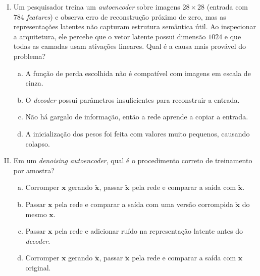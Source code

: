 \documentclass{dlproblemset}
\begin{document}
\begin{enumerate}[I)]

    \item Um pesquisador treina um \textit{autoencoder} sobre imagens $28 \times 28$ (entrada com $784$ \textit{features}) e observa erro de reconstrução próximo de zero, mas as representações latentes não capturam estrutura semântica útil. Ao inspecionar a arquitetura, ele percebe que o vetor latente possui dimensão $1024$ e que todas as camadas usam ativações lineares. Qual é a causa mais provável do problema?
    \begin{enumerate}[(a)]
        \item A função de perda escolhida não é compatível com imagens em escala de cinza.
        \item O \textit{decoder} possui parâmetros insuficientes para reconstruir a entrada.
        \item Não há gargalo de informação, então a rede aprende a copiar a entrada.
        \item A inicialização dos pesos foi feita com valores muito pequenos, causando colapso.
    \end{enumerate}

    \item Em um \textit{denoising autoencoder}, qual é o procedimento correto de treinamento por amostra?
    \begin{enumerate}[(a)]
        \item Corromper $\mathbf{x}$ gerando $\tilde{\mathbf{x}}$, passar $\tilde{\mathbf{x}}$ pela rede e comparar a saída com $\tilde{\mathbf{x}}$.
        \item Passar $\mathbf{x}$ pela rede e comparar a saída com uma versão corrompida $\tilde{\mathbf{x}}$ do mesmo $\mathbf{x}$.
        \item Passar $\mathbf{x}$ pela rede e adicionar ruído na representação latente antes do \textit{decoder}.
        \item Corromper $\mathbf{x}$ gerando $\tilde{\mathbf{x}}$, passar $\tilde{\mathbf{x}}$ pela rede e comparar a saída com $\mathbf{x}$ original.
    \end{enumerate}


\end{enumerate}
\end{document}
